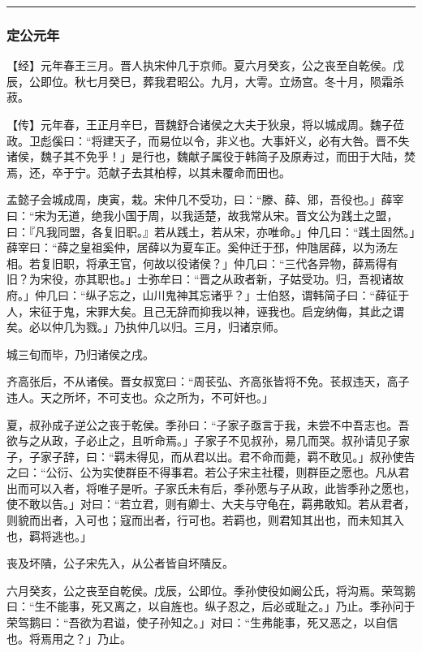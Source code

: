 \documentclass[]{article}
\begin{document}
\begin{center}\rule{0.5\linewidth}{\linethickness}\end{center}

\hypertarget{header-n2874}{%
\subsubsection{定公元年}\label{header-n2874}}

【经】元年春王三月。晋人执宋仲几于京师。夏六月癸亥，公之丧至自乾侯。戊辰，公即位。秋七月癸巳，葬我君昭公。九月，大雩。立炀宫。冬十月，陨霜杀菽。

【传】元年春，王正月辛巳，晋魏舒合诸侯之大夫于狄泉，将以城成周。魏子莅政。卫彪傒曰：``将建天子，而易位以令，非义也。大事奸义，必有大咎。晋不失诸侯，魏子其不免乎！」是行也，魏献子属役于韩简子及原寿过，而田于大陆，焚焉，还，卒于宁。范献子去其柏椁，以其未覆命而田也。

孟懿子会城成周，庚寅，栽。宋仲几不受功，曰：``滕、薛、郳，吾役也。」薛宰曰：``宋为无道，绝我小国于周，以我适楚，故我常从宋。晋文公为践土之盟，曰：『凡我同盟，各复旧职。』若从践土，若从宋，亦唯命。」仲几曰：``践土固然。」薛宰曰：``薛之皇祖奚仲，居薛以为夏车正。奚仲迁于邳，仲虺居薛，以为汤左相。若复旧职，将承王官，何故以役诸侯？」仲几曰：``三代各异物，薛焉得有旧？为宋役，亦其职也。」士弥牟曰：``晋之从政者新，子姑受功。归，吾视诸故府。」仲几曰：``纵子忘之，山川鬼神其忘诸乎？」士伯怒，谓韩简子曰：``薛征于人，宋征于鬼，宋罪大矣。且己无辞而抑我以神，诬我也。启宠纳侮，其此之谓矣。必以仲几为戮。」乃执仲几以归。三月，归诸京师。

城三旬而毕，乃归诸侯之戌。

齐高张后，不从诸侯。晋女叔宽曰：``周苌弘、齐高张皆将不免。苌叔违天，高子违人。天之所坏，不可支也。众之所为，不可奸也。」

夏，叔孙成子逆公之丧于乾侯。季孙曰：``子家子亟言于我，未尝不中吾志也。吾欲与之从政，子必止之，且听命焉。」子家子不见叔孙，易几而哭。叔孙请见子家子，子家子辞，曰：``羁未得见，而从君以出。君不命而薨，羁不敢见。」叔孙使告之曰：``公衍、公为实使群臣不得事君。若公子宋主社稷，则群臣之愿也。凡从君出而可以入者，将唯子是听。子家氏未有后，季孙愿与子从政，此皆季孙之愿也，使不敢以告。」对曰：``若立君，则有卿士、大夫与守龟在，羁弗敢知。若从君者，则貌而出者，入可也；寇而出者，行可也。若羁也，则君知其出也，而未知其入也，羁将逃也。」

丧及坏隤，公子宋先入，从公者皆自坏隤反。

六月癸亥，公之丧至自乾侯。戊辰，公即位。季孙使役如阚公氏，将沟焉。荣驾鹅曰：``生不能事，死又离之，以自旌也。纵子忍之，后必或耻之。」乃止。季孙问于荣驾鹅曰：``吾欲为君谥，使子孙知之。」对曰：``生弗能事，死又恶之，以自信也。将焉用之？」乃止。
\end{document}
